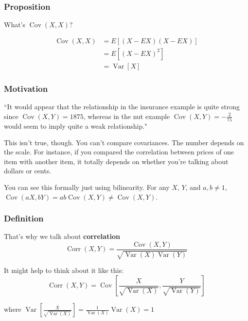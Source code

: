 \documentclass{beamer}
\begin{document}

\begin{frame}
\frametitle{Proposition}

What's $\operatorname{Cov}(X,X)$?
\pause

\begin{align*}
\operatorname{Cov}(X,X) &= E[(X - EX)(X - EX)] \\
&= E[(X-EX)^2] \\
&= \operatorname{Var}[X]
\end{align*}




\end{frame}



\begin{frame}
\frametitle{Motivation}

``It would appear that the relationship in the insurance example is quite strong since $\operatorname{Cov}(X,Y) = 1875$, whereas in the nut example $\operatorname{Cov}(X,Y) = -\frac{2}{75}$ would seem to imply quite a weak relationship."
\newline

This isn't true, though. You can't compare covariances. The number depends on the scale. For instance, if you compared the correlation between prices of one item with another item, it totally depends on whether you're talking about dollars or cents. 
\newline

You can see this formally just using bilinearity. For any $X$, $Y$, and $a,b \neq 1$, $\operatorname{Cov}(aX,bY) = ab\operatorname{Cov}(X,Y) \neq \operatorname{Cov}(X,Y)$.

\end{frame}
\begin{frame}
\frametitle{Definition}

That's why we talk about \textbf{correlation}
\[
\operatorname{Corr}(X,Y) = \frac{\operatorname{Cov}(X,Y)}{\sqrt{\operatorname{Var}(X) \operatorname{Var}(Y) }}
\]
\newline

It might help to think about it like this:
\[
\operatorname{Corr}(X,Y) = \operatorname{Cov} \left[ \frac{X}{ \sqrt{\operatorname{Var}(X)} }, \frac{Y}{\sqrt{\operatorname{Var}(Y)} } \right]
\]

where $\operatorname{Var}  \left[ \frac{X}{ \sqrt{\operatorname{Var}(X)} } \right] = \frac{1}{\operatorname{Var}(X) } \operatorname{Var}(X) = 1$
\end{frame}
\end{document}
